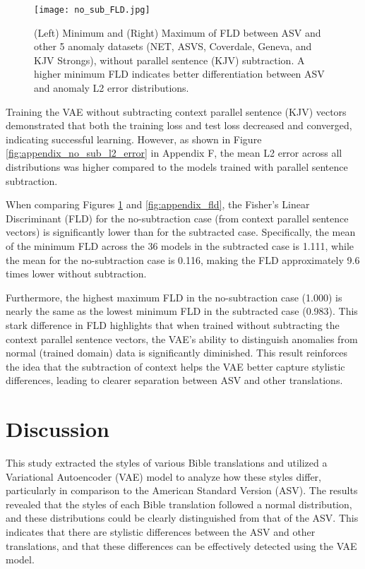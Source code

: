 \begin{figure}[htbp]
    \centering
    \texttt{[image: no\_sub\_FLD.jpg]}
    \caption{(Left) Minimum and (Right) Maximum of FLD between ASV and other 5 anomaly datasets (NET, ASVS, Coverdale, Geneva, and KJV Strongs), without parallel sentence (KJV) subtraction. A higher minimum FLD indicates better differentiation between ASV and anomaly L2 error distributions.}
    \label{fig:appendix_no_sub_fld}
\end{figure}

Training the VAE without subtracting context parallel sentence (KJV) vectors demonstrated that both the training loss and test loss decreased and converged, indicating successful learning. However, as shown in Figure \ref{fig:appendix_no_sub_l2_error} in Appendix F, the mean L2 error across all distributions was higher compared to the models trained with parallel sentence subtraction.

When comparing Figures \ref{fig:appendix_no_sub_fld} and \ref{fig:appendix_fld}, the Fisher’s Linear Discriminant (FLD) for the no-subtraction case (from context parallel sentence vectors) is significantly lower than for the subtracted case. Specifically, the mean of the minimum FLD across the 36 models in the subtracted case is 1.111, while the mean for the no-subtraction case is 0.116, making the FLD approximately 9.6 times lower without subtraction.

Furthermore, the highest maximum FLD in the no-subtraction case (1.000) is nearly the same as the lowest minimum FLD in the subtracted case (0.983). This stark difference in FLD highlights that when trained without subtracting the context parallel sentence vectors, the VAE's ability to distinguish anomalies from normal (trained domain) data is significantly diminished. This result reinforces the idea that the subtraction of context helps the VAE better capture stylistic differences, leading to clearer separation between ASV and other translations.

\section{Discussion}\label{sec:discussion}

This study extracted the styles of various Bible translations and utilized a Variational Autoencoder (VAE) model to analyze how these styles differ, particularly in comparison to the American Standard Version (ASV). The results revealed that the styles of each Bible translation followed a normal distribution, and these distributions could be clearly distinguished from that of the ASV. This indicates that there are stylistic differences between the ASV and other translations, and that these differences can be effectively detected using the VAE model.

